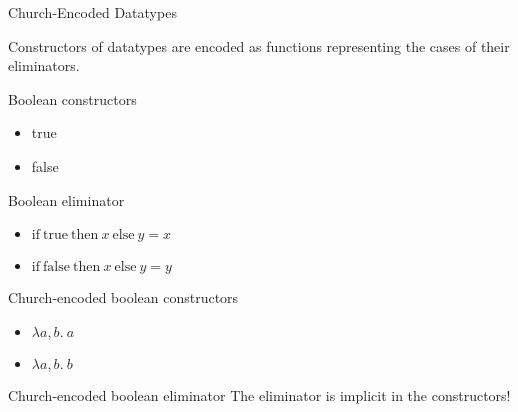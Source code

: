 \documentclass[mathserif]{beamer}
\newcommand{\n}[1]{\textrm{#1}}
\begin{document}
\begin{frame}{Church-Encoded Datatypes}

Constructors of datatypes are encoded as functions representing the
cases of their eliminators.

\begin{block}{Boolean constructors}
\begin{itemize}
\item true
\item false
\end{itemize}
\end{block}

\begin{block}{Boolean eliminator}
\begin{itemize}
\item $\n{if} ~ \n{true} ~ \n{then} ~ x ~ \n{else} ~ y = x$
\item $\n{if} ~ \n{false} ~ \n{then} ~ x ~ \n{else} ~ y = y$
\end{itemize}
\end{block}

\begin{block}{Church-encoded boolean constructors}
\begin{itemize}
\item $\lambda a,b. ~ a$
\item $\lambda a,b. ~ b$
\end{itemize}
\end{block}

\begin{block}{Church-encoded boolean eliminator}
The eliminator is implicit in the constructors!
\end{block}



\end{frame}
\end{document}
